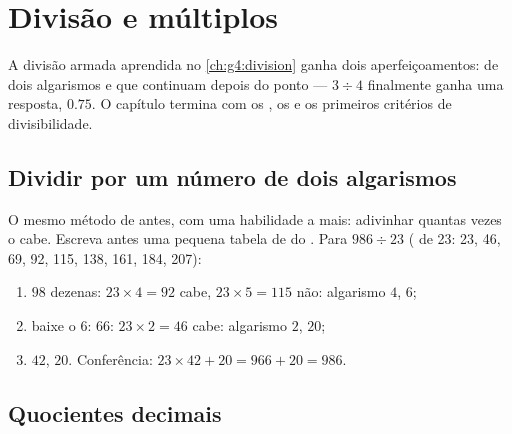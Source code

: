 \chapter{Divisão e múltiplos}\label{ch:g5:division}

A divisão armada aprendida no \cref{ch:g4:division} ganha dois
aperfeiçoamentos:  de dois algarismos e  que
continuam depois do ponto --- $3 \div 4$ finalmente ganha uma
resposta, $0.75$. O capítulo termina com os , os  e
os primeiros critérios de divisibilidade.

\section{Dividir por um número de dois algarismos}

\begin{method}\label{met:g5:division:twodigits}
O mesmo método de antes, com uma habilidade a mais: adivinhar quantas
vezes o  cabe. Escreva antes uma pequena tabela de 
do . Para $986 \div 23$ ( de 23: 23, 46, 69, 92, 115,
138, 161, 184, 207):
\begin{enumerate}
  \item $98$ dezenas: $23 \times 4 = 92$ cabe, $23 \times 5 = 115$
        não: algarismo $4$,  $6$;
  \item baixe o $6$: $66$: $23 \times 2 = 46$ cabe: algarismo $2$,
         $20$;
  \item {} $42$,  $20$. Conferência:
        $23 \times 42 + 20 = 966 + 20 = 986$.
\end{enumerate}
\end{method}

\section{Quocientes decimais}

